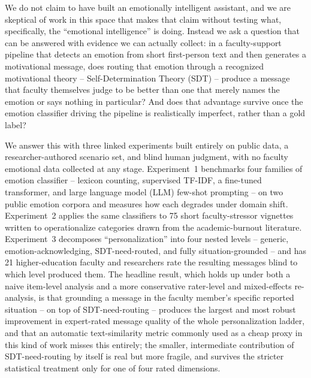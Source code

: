 \documentclass[higheredu,article,submit,pdftex,moreauthors]{Definitions/mdpi}
\begin{document}
We do not claim to have built an emotionally intelligent assistant, and we are skeptical of work in this space that makes that claim without testing what, specifically, the ``emotional intelligence'' is doing. Instead we ask a question that can be answered with evidence we can actually collect: in a faculty-support pipeline that detects an emotion from short first-person text and then generates a motivational message, does routing that emotion through a recognized motivational theory -- Self-Determination Theory (SDT) \cite{deciryan2000} -- produce a message that faculty themselves judge to be better than one that merely names the emotion or says nothing in particular? And does that advantage survive once the emotion classifier driving the pipeline is realistically imperfect, rather than a gold label?

We answer this with three linked experiments built entirely on public data, a researcher-authored scenario set, and blind human judgment, with no faculty emotional data collected at any stage. Experiment~1 benchmarks four families of emotion classifier -- lexicon counting, supervised TF-IDF, a fine-tuned transformer, and large language model (LLM) few-shot prompting -- on two public emotion corpora and measures how each degrades under domain shift. Experiment~2 applies the same classifiers to 75 short faculty-stressor vignettes written to operationalize categories drawn from the academic-burnout literature. Experiment~3 decomposes ``personalization'' into four nested levels -- generic, emotion-acknowledging, SDT-need-routed, and fully situation-grounded -- and has 21 higher-education faculty and researchers rate the resulting messages blind to which level produced them. The headline result, which holds up under both a naive item-level analysis and a more conservative rater-level and mixed-effects re-analysis, is that grounding a message in the faculty member's specific reported situation -- on top of SDT-need-routing -- produces the largest and most robust improvement in expert-rated message quality of the whole personalization ladder, and that an automatic text-similarity metric commonly used as a cheap proxy in this kind of work misses this entirely; the smaller, intermediate contribution of SDT-need-routing by itself is real but more fragile, and survives the stricter statistical treatment only for one of four rated dimensions.
\end{document}
